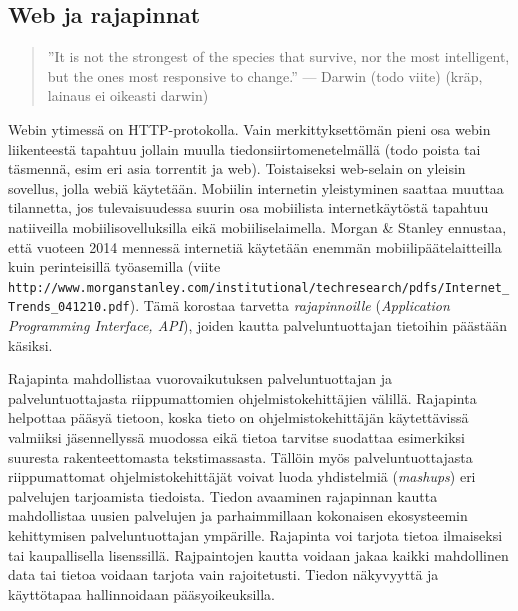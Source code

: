 \documentclass[finnish,gradu]{tktltiki}
\begin{document}

  \subsection{Web ja rajapinnat} %
  \label{sub:web_ja_rajapinnat}

  \begin{quote}
    ''It is not the strongest of the species that survive, nor the most intelligent, but the ones most responsive to change.'' --- Darwin (todo viite) (kräp, lainaus ei oikeasti darwin)
  \end{quote}

  Webin ytimessä on HTTP-protokolla. Vain merkittyksettömän pieni osa webin liikenteestä tapahtuu jollain muulla tiedonsiirtomenetelmällä (todo poista tai täsmennä, esim eri asia torrentit ja web). Toistaiseksi web-selain on yleisin sovellus, jolla webiä käytetään. Mobiilin internetin yleistyminen saattaa muuttaa tilannetta, jos tulevaisuudessa suurin osa mobiilista internetkäytöstä tapahtuu natiiveilla mobiilisovelluksilla eikä mobiiliselaimella. Morgan \& Stanley ennustaa, että vuoteen 2014 mennessä internetiä käytetään enemmän mobiilipäätelaitteilla kuin perinteisillä työasemilla (viite \verb!http://www.morganstanley.com/institutional/techresearch/pdfs/Internet_Trends_041210.pdf!). Tämä korostaa tarvetta \emph{rajapinnoille} (\emph{Application Programming Interface, API}), joiden kautta palveluntuottajan tietoihin päästään käsiksi.

  Rajapinta mahdollistaa vuorovaikutuksen palveluntuottajan ja palveluntuottajasta riippumattomien ohjelmistokehittäjien välillä. Rajapinta helpottaa pääsyä tietoon, koska tieto on ohjelmistokehittäjän käytettävissä valmiiksi jäsennellyssä muodossa eikä tietoa tarvitse suodattaa esimerkiksi suuresta rakenteettomasta tekstimassasta. Tällöin myös palveluntuottajasta riippumattomat ohjelmistokehittäjät voivat luoda yhdistelmiä (\emph{mashups}) eri palvelujen tarjoamista tiedoista. Tiedon avaaminen rajapinnan kautta mahdollistaa uusien palvelujen ja parhaimmillaan kokonaisen ekosysteemin kehittymisen palveluntuottajan ympärille. Rajapinta voi tarjota tietoa ilmaiseksi tai kaupallisella lisenssillä. Rajpaintojen kautta voidaan jakaa kaikki mahdollinen data tai tietoa voidaan tarjota vain rajoitetusti. Tiedon näkyvyyttä ja käyttötapaa hallinnoidaan pääsyoikeuksilla.
\end{document}
